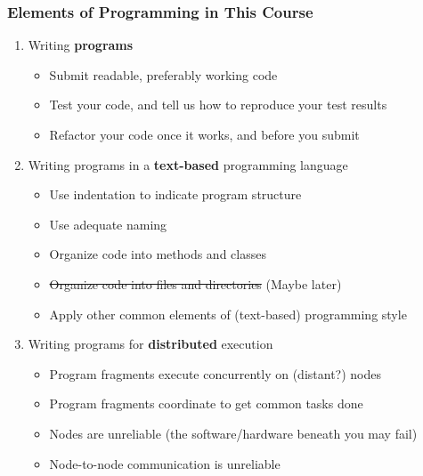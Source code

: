 \begin{frame}

\frametitle{Elements of Programming in This Course}

\begin{enumerate}

\item Writing \textbf{programs}

\begin{itemize}

\footnotesize

\item Submit readable, preferably working code

\item Test your code, and tell us how to reproduce your test results

\item Refactor your code once it works, and before you submit

\end{itemize}

\item Writing programs in a \textbf{text-based} programming language

\begin{itemize}

\footnotesize

\item Use indentation to indicate program structure

\item Use adequate naming

\item Organize code into methods and classes

\item \sout{Organize code into files and directories} (Maybe later)

\item Apply other common elements of (text-based) programming style

\end{itemize}

\item Writing programs for \textbf{distributed} execution

\begin{itemize}

\footnotesize

\item Program fragments execute concurrently on (distant?) nodes

\item Program fragments coordinate to get common tasks done

\item Nodes are unreliable (the software/hardware beneath you may fail)

\item Node-to-node communication is unreliable

\end{itemize}

\end{enumerate}

\end{frame}
